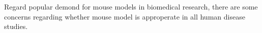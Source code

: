 Regard popular demond for mouse models in biomedical research, there are some concerns regarding whether mouse model is approperate in all human disease studies. 